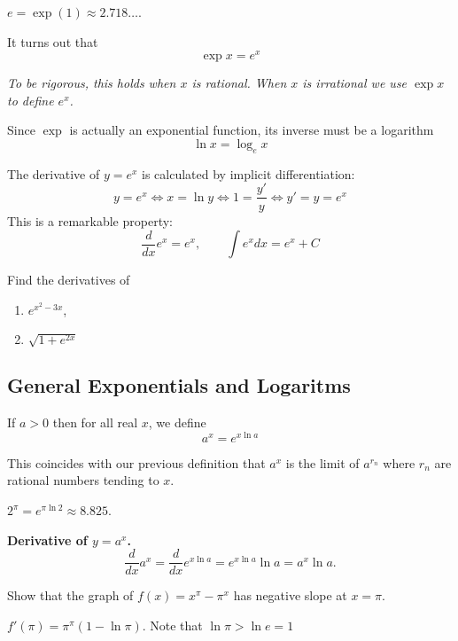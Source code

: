 \documentclass[../main.tex]{subfiles}
\begin{document}
\begin{definition}
    $e = \exp(1) \approx 2.718 \dots$.
\end{definition}

It turns out that
\[
    \exp x = e^x
\]

\textit{To be rigorous, this holds when $x$ is rational. When $x$ is irrational we use $\exp x$ to define $e^x$.}

Since $\exp$ is actually an exponential function, its inverse must be a logarithm
\[
    \ln x = \log_e x
\]

The derivative of $y = e^x$ is calculated by implicit differentiation:
\[
    y = e^x \iff
    x = \ln y \iff
    1 = \frac{y'}{y} \iff
    y' = y = e^x
\]
This is a remarkable property:
\[
    \frac{d}{dx} e^x = e^x, \qquad \int e^x dx = e^x + C
\]

\begin{example}
    Find the derivatives of
    \begin{enumerate}
        \item $e^{x^2-3x}$,
        \item $\sqrt{1+e^{2x}}$
    \end{enumerate}
\end{example}

\subsection*{General Exponentials and Logaritms}
\begin{definition}
If $a>0$ then for all real $x$, we define
\[
    a^x = e^{x \ln a}
\]
\end{definition}
This coincides with our previous definition that $a^x$ is the limit of $a^{r_n}$ where $r_n$ are rational numbers tending to $x$.

\begin{example}
    $2^{\pi} = e^{\pi \ln 2} \approx 8.825$.
\end{example}

\textbf{Derivative of $y=a^x$.}
\[
    \frac{d}{dx} a^x = \frac{d}{dx} e^{x \ln a} = e^{x \ln a} \ln a = a^x \ln a.
\]

\begin{example}
    Show that the graph of $f(x) = x^{\pi} - \pi^x$ has negative slope at $x = \pi$.
\end{example}
\begin{solution}
    $f'(\pi) = \pi^{\pi} (1- \ln \pi)$. Note that $\ln \pi > \ln e = 1$
\end{solution}
\end{document}
